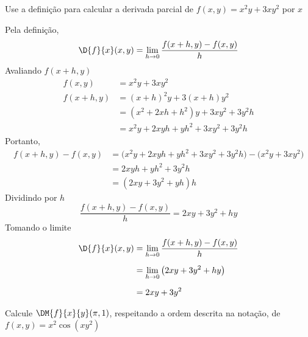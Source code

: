 \documentclass[a4paper,12pt,fleqn]{article}
\begin{document}

Use a definição para calcular a derivada parcial de
\(
  f(x, y) = x^2y + 3xy^2
\)
por $x$

\begin{answer}
Pela definição,
\[
  \D{f}{x}(x, y) = \lim_{h \to 0} \frac{f(x+h, y) - f(x, y)}{h}
\]
Avaliando $f(x+h, y)$
\begin{align*}
  f(x, y)
  & = x^2y + 3xy^2
  \\[2mm]
  f(x+h, y)
  & = (x+h)^2y + 3(x+h)y^2 \\[2mm]
  & = (x^2 + 2xh + h^2)y + 3xy^2 + 3y^2h \\[2mm]
  & = x^2y + 2xyh + yh^2 + 3xy^2 + 3y^2h
\end{align*}
Portanto,
\begin{align*}
  f(x+h, y) - f(x,y)
  & = \big(x^2y + 2xyh + yh^2 + 3xy^2 + 3y^2h\big) - \big(x^2y + 3xy^2\big) \\[2mm]
  & = 2xyh + yh^2 + 3y^2h \\[2mm]
  & = (2xy + 3y^2 + yh)h
\end{align*}
Dividindo por $h$
\[
  \frac{f(x+h, y) - f(x, y)}{h} = 2xy + 3y^2 + hy
\]
Tomando o limite
\begin{align*}
  \D{f}{x}(x,y)
  & = \lim_{h \to 0} \frac{f(x+h,y) - f(x,y)}{h} \\[2mm]
  & = \lim_{h \to 0} \big(2xy + 3y^2 + hy\big) \\[2mm]
  & = 2xy + 3y^2
\end{align*}
\end{answer}

Calcule \(\DM{f}{x}{y}(\pi, 1)\)\!, respeitando a ordem descrita na notação, de
\(
  f(x, y) = x^2\cos\left(xy^2\right)
\)
\end{document}
